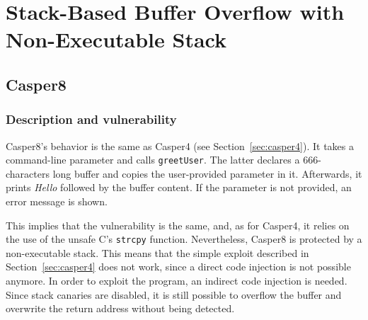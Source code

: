 \section{Stack-Based Buffer Overflow with Non-Executable Stack} \label{sec:nonEx}
\subsection{Casper8}
\subsubsection{Description and vulnerability}
Casper8's behavior is the same as Casper4 (see Section~\ref{sec:casper4}). It takes a command-line parameter and calls \texttt{greetUser}. The latter declares a 666-characters long buffer and copies the user-provided parameter in it. Afterwards, it prints \textit{Hello} followed by the buffer content. If the parameter is not provided, an error message is shown.

This implies that the vulnerability is the same, and, as for Casper4, it relies on the use of the unsafe C's \texttt{strcpy} function. Nevertheless, Casper8 is protected by a non-executable stack. This means that the simple exploit described in Section~\ref{sec:casper4} does not work, since a direct code injection is not possible anymore. In order to exploit the program, an indirect code injection is needed. Since stack canaries are disabled, it is still possible to overflow the buffer and overwrite the return address without being detected.

